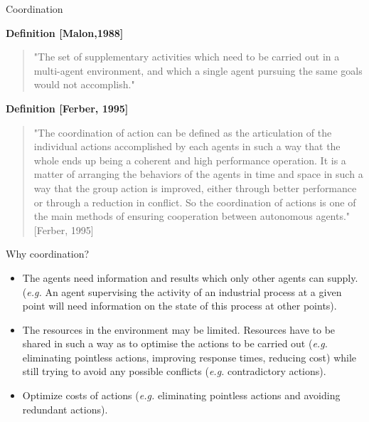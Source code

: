 \documentclass[9pt]{beamer}
\begin{document}
\begin{frame}[noframenumbering]{Coordination}
\begin{small}

\textbf{Definition [Malon,1988]}
\begin{quotation}
"The set of supplementary activities which need to be carried out in a multi-agent environment, and which a single agent pursuing the same goals would not accomplish."  
\end{quotation}

\vspace{4mm}

\textbf{Definition [Ferber, 1995]}
\begin{quotation}
"The coordination of action can be defined as the articulation  of the individual actions accomplished by each agents in such a way that the whole ends up being a \textcolor{CS-1light}{coherent and high performance} operation. It is a matter of arranging the behaviors of the agents in time and space in such a way that the group action is improved, either through \textcolor{CS-1light}{better performance} or through \textcolor{CS-1light}{a reduction in conflict}. So the coordination of actions is one of the main methods of ensuring cooperation between autonomous agents." [Ferber, 1995] 
\end{quotation}

\end{small}
\end{frame}

\begin{frame}[noframenumbering]{Why coordination?}
\begin{small}

\begin{itemize}
\item The agents need \textcolor{CS-1light}{information and results} which only other agents can supply.\\
(\emph{e.g.} An agent supervising the activity of an industrial process at a given point will need information on the state of this process at other points).
\item The resources in the environment may be \textcolor{CS-1light}{limited}. Resources have to be shared in such a way as to optimise the actions to be carried out (\emph{e.g.} eliminating pointless actions, improving response times, reducing cost) while still trying to avoid any possible conflicts (\emph{e.g.} contradictory actions).
\item Optimize \textcolor{CS-1light}{costs} of actions (\emph{e.g.} eliminating pointless actions and avoiding redundant actions).
\end{itemize}

\end{small}
\end{frame}
\end{document}
